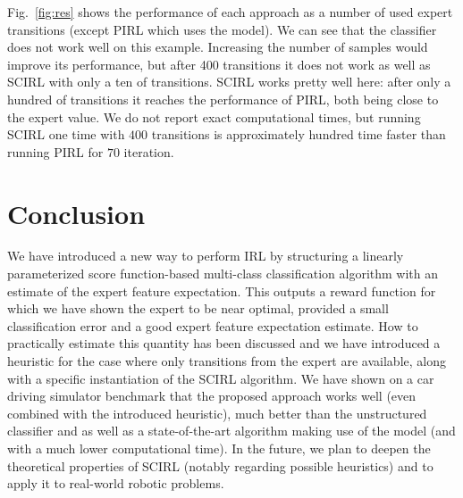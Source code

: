 \documentclass[english,utf8]{./hermes-journal}
\begin{document}
Fig.~\ref{fig:res} shows the performance of each approach as a
number of used expert transitions (except PIRL which uses the
model). We can see that the classifier does not work well on this
example. Increasing the number of samples would improve its
performance, but after 400 transitions it does not work as well as
SCIRL with only a ten of transitions. SCIRL works pretty well here:
after only a hundred of transitions it reaches the performance of
PIRL, both being close to the expert value. We do not report exact
computational times, but running SCIRL one time with $400$
transitions is approximately hundred time faster than running PIRL
for $70$ iteration.
%



\section{Conclusion}
\label{sec:conclusion}

We have introduced a new way to perform IRL by structuring a
linearly parameterized score function-based multi-class
classification algorithm with an estimate of the expert feature
expectation. This outputs a reward function for which we have shown
the expert to be near optimal, provided a small classification error
and a good expert feature expectation estimate. How to practically
estimate this quantity has been  discussed and we have introduced a
heuristic for the case where only transitions from the expert are
available, along with a specific instantiation of the SCIRL
algorithm. We have shown on a car driving simulator benchmark that
the proposed approach works well (even combined with the introduced
heuristic), much better than the unstructured classifier and as well
as a state-of-the-art algorithm making use of the model (and with a
much lower computational time). In the future, we plan to deepen the
theoretical properties of SCIRL (notably regarding possible
heuristics) and to apply it to real-world robotic problems.


\newpage

\end{document}

